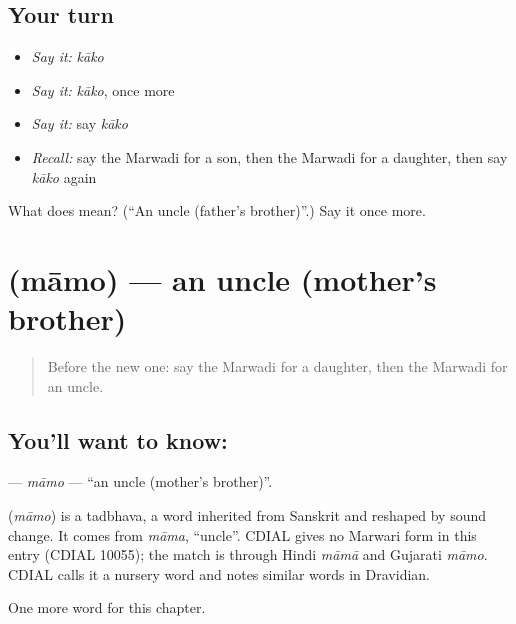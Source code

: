 \subsection*{Your turn}
\begin{itemize}
\raggedright
  \item \emph{Say it:} \emph{kāko}
  \item \emph{Say it:} \emph{kāko}, once more
  \item \emph{Say it:} say \emph{kāko}
  \item \emph{Recall:} say the Marwadi for a son, then the Marwadi for a daughter, then say \emph{kāko} again
\end{itemize}

\begin{tcolorbox}[breakable,colback=teal!4,colframe=teal!35!black,title={Before you move on}]
What does  mean? (\textquotedblleft{}An uncle (father's brother)\textquotedblright{}.) Say it once more.
\end{tcolorbox}
\section[\texorpdfstring{\mw{मामो} (māmo)}{मामो (māmo)}]{ (māmo) — an uncle (mother's brother)}

\label{lesson:MW-C49-mamo}



\begin{quote}
Before the new one: say the Marwadi for a daughter, then the Marwadi for an uncle.
\end{quote}

\subsection*{You'll want to know: }
\textbf{} — \emph{māmo} — \textquotedblleft{}an uncle (mother's brother)\textquotedblright{}.

\begin{cousinweb}
\textbf{} (\emph{māmo}) is a tadbhava, a word inherited from Sanskrit and reshaped by sound change. It comes from \emph{māma}, \textquotedblleft{}uncle\textquotedblright{}. CDIAL gives no Marwari form in this entry (CDIAL 10055); the match is through Hindi \emph{māmā} and Gujarati \emph{māmo}. CDIAL calls it a nursery word and notes similar words in Dravidian.
\end{cousinweb}

\begin{grammarlens}[title={What you've built}]
One more word for this chapter.
\end{grammarlens}

